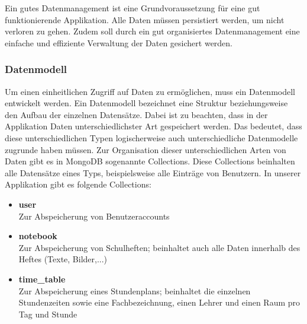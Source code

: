
Ein gutes Datenmanagement ist eine Grundvoraussetzung für eine
gut funktionierende Applikation. Alle Daten müssen persistiert werden, um nicht verloren zu gehen. Zudem soll durch ein gut organisiertes Datenmanagement eine einfache und effiziente Verwaltung der Daten gesichert werden.

\subsubsection{Datenmodell}
Um einen einheitlichen Zugriff auf Daten zu ermöglichen, muss ein Datenmodell entwickelt werden. Ein Datenmodell bezeichnet eine Struktur beziehungsweise den Aufbau der einzelnen Datensätze. Dabei ist zu beachten, dass in der Applikation Daten unterschiedlichster Art gespeichert werden. Das bedeutet, dass diese unterschiedlichen Typen logischerweise auch unterschiedliche Datenmodelle zugrunde haben müssen. Zur Organisation dieser unterschiedlichen Arten von Daten gibt es in MongoDB sogenannte Collections. Diese Collections beinhalten alle Datensätze eines Typs, beispielsweise alle Einträge von Benutzern. In unserer Applikation gibt es folgende Collections:
\begin{itemize}
\item \textbf{user}\\ Zur Abspeicherung von Benutzeraccounts
\item \textbf{notebook}\\ Zur Abspeicherung von Schulheften; beinhaltet auch alle Daten innerhalb des Heftes (Texte, Bilder,...)
\item \textbf{time\_table}\\ Zur Abspeicherung eines Stundenplans; beinhaltet die einzelnen Stundenzeiten sowie eine Fachbezeichnung, einen Lehrer und einen Raum pro Tag und Stunde
\end{itemize}

\newpage

